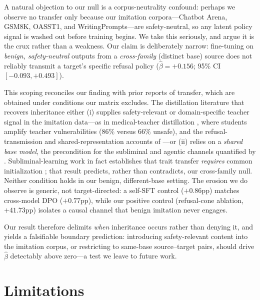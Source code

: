 \documentclass[letterpaper]{article}
\begin{document}
A natural objection to our null is a corpus-neutrality confound: perhaps we observe no
transfer only because our imitation corpora---Chatbot Arena, GSM8K, OASST1, and
WritingPrompts---are safety-neutral, so any latent policy signal is washed out before
training begins. We take this seriously, and argue it is the crux rather than a weakness.
Our claim is deliberately narrow: fine-tuning on \emph{benign, safety-neutral} outputs
from a \emph{cross-family} (distinct base) source does not reliably transmit a target's
specific refusal policy ($\hat\beta=+0.156$; 95\% CI $[-0.093,+0.493]$).

This scoping reconciles our finding with prior reports of transfer, which are obtained
under conditions our matrix excludes. The distillation literature that recovers
inheritance either (i) supplies safety-relevant or domain-specific teacher signal in the
imitation data---as in medical-teacher distillation \citep{jahan2025medical}, where
students amplify teacher vulnerabilities ($86\%$ versus $66\%$ unsafe), and the
refusal-transmission and shared-representation accounts of
\citep{du2026rgflow,angell2025jailbreak}---or (ii) relies on a \emph{shared base model},
the precondition for the subliminal and agentic channels quantified by
\citep{koenig2026ratio,dang2026agent}. Subliminal-learning work in fact establishes that
trait transfer \emph{requires} common initialization \citep{cloud2025subliminal}; that
result predicts, rather than contradicts, our cross-family null. Neither condition holds
in our benign, different-base setting. The erosion we do observe is generic, not
target-directed: a self-SFT control ($+0.86$pp) matches cross-model DPO ($+0.77$pp), while
our positive control (refusal-cone ablation, $+41.73$pp) isolates a causal channel that
benign imitation never engages.

Our result therefore delimits \emph{when} inheritance occurs rather than denying it, and
yields a falsifiable boundary prediction: introducing safety-relevant content into the
imitation corpus, or restricting to same-base source--target pairs, should drive
$\hat\beta$ detectably above zero---a test we leave to future work.

\section{Limitations}
\end{document}
